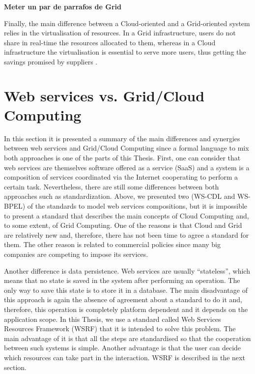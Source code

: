 {\bf Meter un par de parrafos de Grid}

Finally, the main difference between a Cloud-oriented and a Grid-oriented system relies in the virtualisation of resources. 
In a Grid infrastructure, users do not share in real-time the resources allocated to them, 
whereas in a Cloud infrastructure the virtualisation is essential to serve more users,
thus getting the savings promised by suppliers \cite{}.

\section{Web services vs. Grid/Cloud Computing}

In this section it is presented a summary of the main differences and synergies between web services and
Grid/Cloud Computing since a formal language to mix both approaches is one of the parts of this
Thesis. First, one can consider that web services are themselves software offered as a service (SaaS)
and a system is a composition of services coordinated via the Internet
cooperating to perform a certain task. Nevertheless, 
there are still some differences between both approaches such as standardization. Above,
we presented two (WS-CDL and WS-BPEL) of the standards to model web services compositions, but
it is impossible to present a standard that describes the main concepts of Cloud Computing and, to some
extent, of Grid Computing. One of the reasons is that Cloud and Grid are relatively new and, therefore,
there has not been time to agree a standard for them. The other reason is related to commercial policies since
many big companies are competing to impose its services.  

Another difference is data persistence. Web services are usually ``stateless'', which means that
no state is saved in the system after performing an operation. The only way to save
this state is to store it in a database. The main disadvantage of this approach is again the absence of 
agreement about a standard to do it and, therefore, this operation is completely platform dependent 
and it depends on the application scope. 
In this Thesis, we use a standard called Web Services Resources Framework (WSRF) that it is intended to solve this problem. 
The main advantage of it is that all the steps are standardised so that the cooperation 
between such systems is simple. Another advantage is that the user can decide which 
resources can take part in the interaction. WSRF is described in the next section. 

